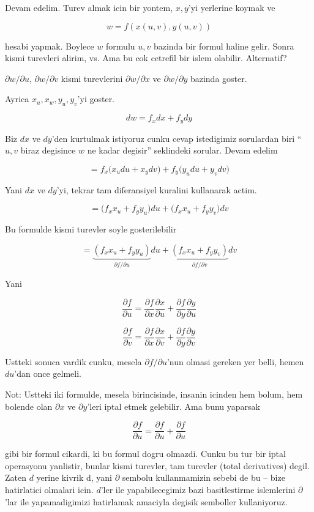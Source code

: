 \documentclass[12pt,fleqn]{article}\usepackage{../common}
\begin{document}
Devam edelim. Turev almak icin bir yontem, $x,y$'yi yerlerine koymak ve

\[ w = f(x(u,v),y(u,v)) \]

hesabi yapmak. Boylece $w$ formulu $u,v$ bazinda bir formul haline
gelir. Sonra kismi turevleri alirim, vs. Ama bu cok cetrefil bir islem
olabilir. Alternatif?

$\partial w/\partial u$, $\partial w/\partial v$ kismi turevlerini $\partial w/\partial x$ ve $\partial w/\partial y$ bazinda goster.

Ayrica $x_u, x_w, y_u, y_v$'yi goster. 

\[ dw =  f_xdx + f_y dy\]

Biz $dx$ ve $dy$'den kurtulmak istiyoruz cunku cevap istedigimiz sorulardan
biri ``$u,v$ biraz degisince $w$ ne kadar degisir'' seklindeki
sorular. Devam edelim

\[ = f_x \bigg( x_u du + x_y dv \bigg) + 
f_y \bigg( y_u du + y_v dv \bigg) \]

Yani $dx$ ve $dy$'yi, tekrar tam diferansiyel kuralini kullanarak actim. 

\[ = \bigg(f_x x_u + f_yy_u \bigg)du  + 
\bigg(f_xx_u + f_yy_v \bigg) dv \]

Bu formulde kismi turevler soyle gosterilebilir

\[ = 
\underbrace{(f_x x_u + f_yy_u )}_{\partial f/\partial u}du  + 
\underbrace{(f_xx_u + f_yy_v)}_{\partial f/\partial v}dv
\]

Yani

\[ \frac{\partial f}{\partial u} = 
\frac{\partial f}{\partial x}\frac{\partial x}{\partial u} +
\frac{\partial f}{\partial y}\frac{\partial y}{\partial u} 
\]

\[ \frac{\partial f}{\partial v} = 
\frac{\partial f}{\partial x}\frac{\partial x}{\partial v} +
\frac{\partial f}{\partial y}\frac{\partial y}{\partial v} 
\]

Ustteki sonuca vardik cunku, mesela $\partial f/\partial u$'nun olmasi gereken yer belli, 
hemen $du$'dan once gelmeli.

Not: Ustteki iki formulde, mesela birincisinde, insanin icinden hem bolum,
hem bolende olan $\partial x$ ve $\partial y$'leri iptal etmek
gelebilir. Ama bunu yaparsak

\[ \frac{\partial f}{\partial u} = 
\frac{\partial f}{\partial u} + \frac{\partial f}{\partial u} 
\]

gibi bir formul cikardi, ki bu formul dogru olmazdi. Cunku bu tur bir iptal
operasyonu yanlistir, bunlar kismi turevler, tam turevler (total
derivatives) degil. Zaten $d$ yerine kivrik d, yani $\partial$ sembolu
kullanmamizin sebebi de bu -- bize hatirlatici olmalari icin. $d$'ler ile
yapabilecegimiz bazi basitlestirme islemlerini $\partial$'lar ile
yapamadigimizi hatirlamak amaciyla degisik semboller kullaniyoruz. 
\end{document}
